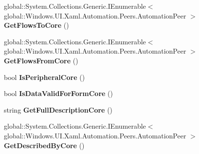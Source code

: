 \begin{DoxyCompactItemize}
global\+::\+System.\+Collections.\+Generic.\+I\+Enumerable$<$ global\+::\+Windows.\+U\+I.\+Xaml.\+Automation.\+Peers.\+Automation\+Peer $>$ {\bfseries Get\+Flows\+To\+Core} ()
\item 
\mbox{\label{interface_windows_1_1_u_i_1_1_xaml_1_1_automation_1_1_peers_1_1_i_automation_peer_overrides5_ad5034fd0fa56bd30ad0fdaf85f6eff9c}} 
global\+::\+System.\+Collections.\+Generic.\+I\+Enumerable$<$ global\+::\+Windows.\+U\+I.\+Xaml.\+Automation.\+Peers.\+Automation\+Peer $>$ {\bfseries Get\+Flows\+From\+Core} ()
\item 
\mbox{\label{interface_windows_1_1_u_i_1_1_xaml_1_1_automation_1_1_peers_1_1_i_automation_peer_overrides5_ae3adfbb55905d7d2ff9ead0e1a6ae6a2}} 
bool {\bfseries Is\+Peripheral\+Core} ()
\item 
\mbox{\label{interface_windows_1_1_u_i_1_1_xaml_1_1_automation_1_1_peers_1_1_i_automation_peer_overrides5_a78142ee2e5244e2fbb9216d54143bf43}} 
bool {\bfseries Is\+Data\+Valid\+For\+Form\+Core} ()
\item 
\mbox{\label{interface_windows_1_1_u_i_1_1_xaml_1_1_automation_1_1_peers_1_1_i_automation_peer_overrides5_ae4fe16606bf1afc7f1452aec94e74f1a}} 
string {\bfseries Get\+Full\+Description\+Core} ()
\item 
\mbox{\label{interface_windows_1_1_u_i_1_1_xaml_1_1_automation_1_1_peers_1_1_i_automation_peer_overrides5_a22cd781a868a550b1baa7366dcac101b}} 
global\+::\+System.\+Collections.\+Generic.\+I\+Enumerable$<$ global\+::\+Windows.\+U\+I.\+Xaml.\+Automation.\+Peers.\+Automation\+Peer $>$ {\bfseries Get\+Described\+By\+Core} ()
\item 
\mbox{\label{interface_windows_1_1_u_i_1_1_xaml_1_1_automation_1_1_peers_1_1_i_automation_peer_overrides5_aae43fba3e3aa03268f906c31c86a1dfd}} 

\end{DoxyCompactItemize}
